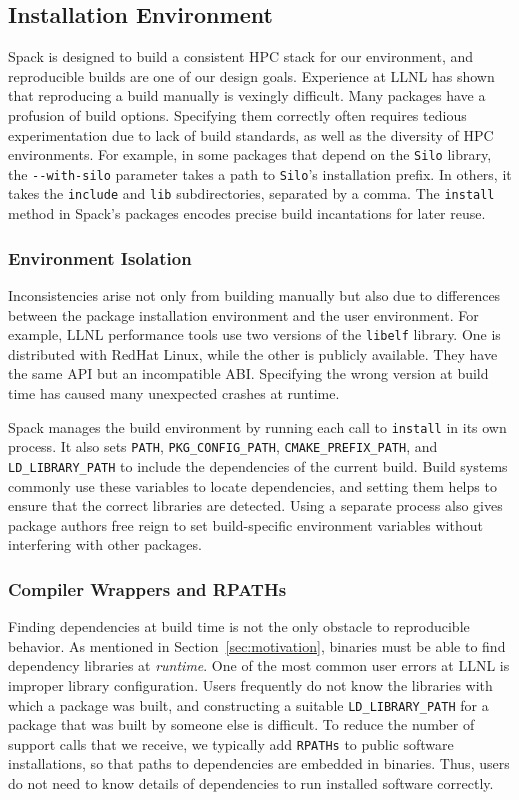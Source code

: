 
\subsection{Installation Environment}

Spack is designed to build a consistent HPC stack for our
environment, and reproducible builds are one of our design goals.
Experience at LLNL has shown that reproducing a build manually
is vexingly difficult.
%
Many packages have a profusion of build options. Specifying
them correctly often requires tedious experimentation due to lack of
build standards, as well as the diversity of HPC environments.
For example, in some packages that depend on the {\tt Silo} library,
the \verb|--with-silo| parameter takes a path to {\tt Silo}'s installation 
prefix. In others, it takes the {\tt include} and {\tt lib} subdirectories,
separated by a comma.
The {\tt install} method in Spack's packages encodes precise build
incantations for later reuse.

\subsubsection{Environment Isolation}
Inconsistencies arise not only from building manually but also due to 
differences between the package installation environment and the user
environment.
%
For example, LLNL performance tools use two versions of the {\tt libelf}
library. One is distributed with RedHat Linux, while the
other is publicly available. They have the same API but an incompatible ABI.
Specifying the wrong version at build time has caused many
unexpected crashes at runtime.

Spack manages the build environment by running each call to {\tt install}
in its own process.  It also sets
{\tt PATH}, {\tt PKG\_CONFIG\_PATH}, {\tt CMAKE\_PREFIX\_PATH}, and
{\tt LD\_LIBRARY\_PATH} to include the dependencies of the current build.
Build systems commonly use these variables to locate dependencies,
and setting them helps to ensure that the correct libraries are detected.
Using a separate process also gives package authors
free reign to set build-specific environment variables without interfering
with other packages.

\subsubsection{Compiler Wrappers and RPATHs}
Finding dependencies at build time is not the only obstacle to reproducible
behavior.  As mentioned in Section~\ref{sec:motivation}, binaries must be 
able to find dependency libraries at {\it runtime}.
One of the most common user errors at LLNL is improper library configuration.
Users frequently do not know the libraries with which a package was built, and
constructing a suitable {\tt LD\_LIBRARY\_PATH} for a package that was built 
by someone else is difficult. To reduce the number of support calls that we 
receive, we typically add {\tt RPATHs} to public software installations, so 
that paths to dependencies are embedded in binaries. Thus, users do not need 
to know details of dependencies to run installed software correctly.

